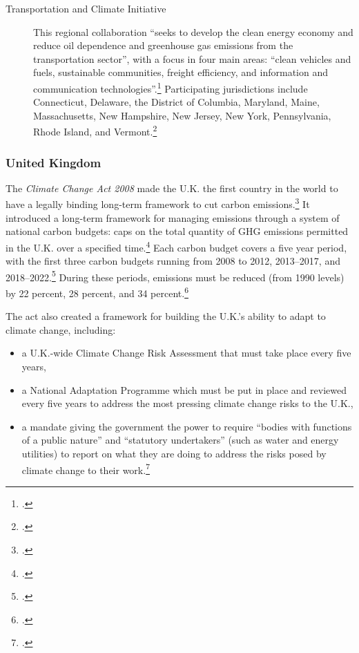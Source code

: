 \documentclass[10pt]{article}
\begin{document}
\begin{description}
	\item[Transportation and Climate Initiative] This regional collaboration ``seeks to develop the clean energy economy and reduce oil dependence and greenhouse gas emissions from the transportation sector'', with a focus in four main areas: ``clean vehicles and fuels, sustainable communities, freight efficiency, and information and communication technologies''.\footcite[][]{TranspoClimate} Participating jurisdictions include Connecticut, Delaware, the District of Columbia, Maryland, Maine, Massachusetts, New Hampshire, New Jersey, New York, Pennsylvania, Rhode Island, and Vermont.\footcite[][]{GeorgetownOnTC}
\end{description}



	\subsubsection{United Kingdom}



The \emph{Climate Change Act 2008} made the U.K. the first country in the world to have a legally binding long-term framework to cut carbon emissions.\footcite[][]{ClimateConvention2009}
It introduced a long-term framework for managing emissions through a system of national carbon budgets: caps on the total quantity of GHG emissions permitted in the U.K. over a specified time.\footcite[][]{ClimateConvention2009}
Each carbon budget covers a five year period, with the first three carbon budgets running from 2008 to 2012, 2013--2017, and 2018--2022.\footcite[][]{ClimateConvention2009}
During these periods, emissions must be reduced (from 1990 levels) by 22 percent, 28 percent, and 34 percent.\footcite[][]{ClimateConvention2009}



The act also created a framework for building the U.K.'s ability to adapt to climate change, including:
\begin{itemize}
	\item a U.K.-wide Climate Change Risk Assessment that must take place every five years,
	\item a National Adaptation Programme which must be put in place and reviewed every five years to address the most pressing climate change risks to the U.K.,
	\item a mandate giving the government the power to require ``bodies with functions of a public nature'' and ``statutory undertakers'' (such as water and energy utilities) to report on what they are doing to address the risks posed by climate change to their work.\footcite[][]{ClimateConvention2009}
\end{itemize}
\end{document}
